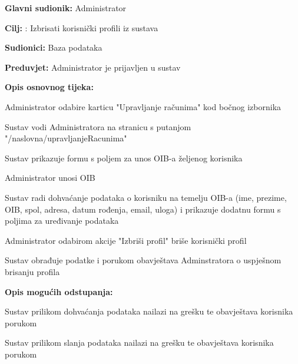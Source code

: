 				
				
				
				\noindent {}
				\begin{packed_item}
					
					\item \textbf{Glavni sudionik: }Administrator
					\item  \textbf{Cilj:} : Izbrisati korisnički profili iz sustava
					\item  \textbf{Sudionici:} Baza podataka
					\item  \textbf{Preduvjet:} Administrator je prijavljen u sustav
					\item  \textbf{Opis osnovnog tijeka:}
					
					\item[] \begin{packed_enum}						
						\item Administrator odabire karticu "Upravljanje računima" kod bočnog izbornika
						\item Sustav vodi Administratora na stranicu s putanjom "/naslovna/upravljanjeRacunima"
						\item Sustav prikazuje formu s poljem za unos OIB-a željenog korisnika
						\item Administrator unosi OIB
						\item Sustav radi dohvaćanje podataka o korisniku na temelju OIB-a (ime, prezime, OIB, spol, adresa, datum rođenja, email, uloga) i prikazuje dodatnu formu s poljima za uređivanje podataka
						\item Administrator odabirom akcije "Izbriši profil" briše korisnički profil
						\item Sustav obrađuje podatke i porukom obavještava Adminstratora o uspješnom brisanju profila
					\end{packed_enum}	
					
					\item  \textbf{Opis mogućih odstupanja:}
					
					\item[] \begin{packed_item}
						\item[5.a] Sustav prilikom dohvaćanja podataka nailazi na grešku te obavještava korisnika porukom
						\item[8.a] Sustav prilikom slanja podataka nailazi na grešku te obavještava korisnika porukom
					\end{packed_item}
					
				\end{packed_item}					
				
